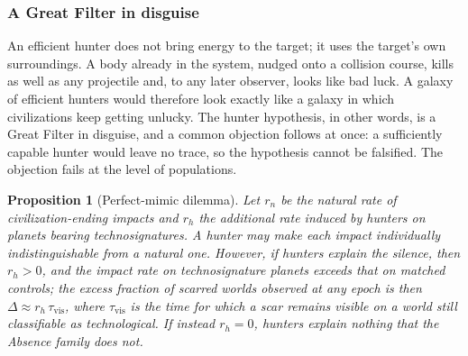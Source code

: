 \documentclass[preprint,12pt]{elsarticle}
\newtheorem{proposition}{Proposition}
\theoremstyle{definition}
\begin{document}
\subsubsection{A Great Filter in disguise}

An efficient hunter does not bring energy to the target; it uses the target's own surroundings. A body already in the system, nudged onto a collision course, kills as well as any projectile and, to any later observer, looks like bad luck. A galaxy of efficient hunters would therefore look exactly like a galaxy in which civilizations keep getting unlucky. The hunter hypothesis, in other words, is a Great Filter in disguise, and a common objection follows at once: a sufficiently capable hunter would leave no trace, so the hypothesis cannot be falsified. The objection fails at the level of populations.

\begin{proposition}[Perfect-mimic dilemma]
\label{prop:mimic}
Let $r_{n}$ be the natural rate of civilization-ending impacts and $r_{h}$ the additional rate induced by hunters on planets bearing technosignatures. A hunter may make each impact individually indistinguishable from a natural one. However, if hunters explain the silence, then $r_{h} > 0$, and the impact rate on technosignature planets exceeds that on matched controls; the excess fraction of scarred worlds observed at any epoch is then $\Delta \approx r_{h}\,\tau_{\mathrm{vis}}$, where $\tau_{\mathrm{vis}}$ is the time for which a scar remains visible on a world still classifiable as technological. If instead $r_{h} = 0$, hunters explain nothing that the Absence family does not.
\end{proposition}
\end{document}
